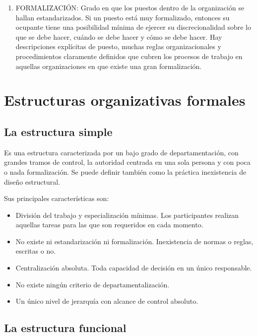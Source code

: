 \documentclass[
]{krantz}
\providecommand{\tightlist}{%
  \setlength{\itemsep}{0pt}\setlength{\parskip}{0pt}}
\begin{document}
\begin{enumerate}
\item
  FORMALIZACIÓN: Grado en que los puestos dentro de la organización se hallan estandarizados. Si un puesto está muy formalizado, entonces su ocupante tiene una posibilidad mínima de ejercer su discrecionalidad sobre lo que se debe hacer, cuándo se debe hacer y cómo se debe hacer. Hay descripciones explícitas de puesto, muchas reglas organizacionales y procedimientos claramente definidos que cubren los procesos de trabajo en aquellas organizaciones en que existe una gran formalización.
\end{enumerate}

\hypertarget{estructuras-organizativas-formales}{%
\section{Estructuras organizativas formales}\label{estructuras-organizativas-formales}}

\hypertarget{la-estructura-simple}{%
\subsection{La estructura simple}\label{la-estructura-simple}}

Es una estructura caracterizada por un bajo grado de departamentación, con grandes tramos de control, la autoridad centrada en una sola persona y con poca o nada formalización. Se puede definir también como la práctica inexistencia de diseño estructural.

Sus principales características son:

\begin{itemize}
\tightlist
\item
  División del trabajo y especialización mínimas. Los participantes realizan aquellas tareas para las que son requeridos en cada momento.
\item
  No existe ni estandarización ni formalización. Inexistencia de normas o reglas, escritas o no.
\item
  Centralización absoluta. Toda capacidad de decisión en un único responsable.
\item
  No existe ningún criterio de departamentalización.
\item
  Un único nivel de jerarquía con alcance de control absoluto.
\end{itemize}

\hypertarget{la-estructura-funcional}{%
\subsection{La estructura funcional}\label{la-estructura-funcional}}
\end{document}
